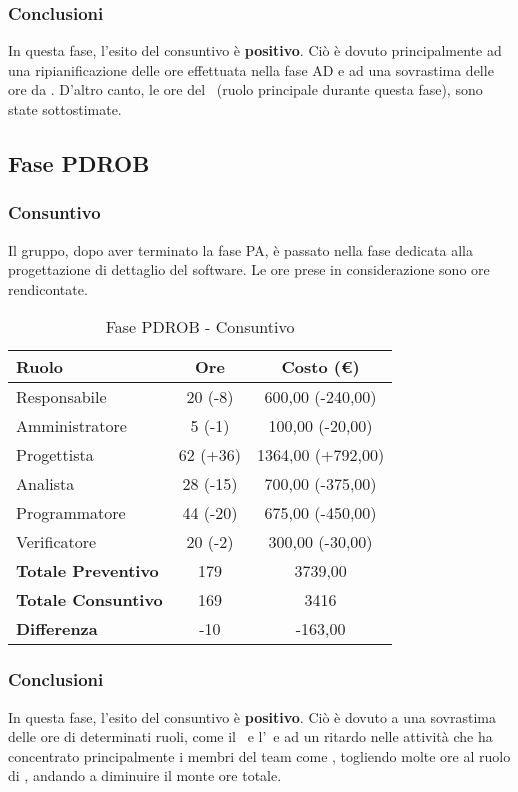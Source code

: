 \documentclass[../PianoProgetto.tex]{subfiles}
\begin{document}
	\subsubsection{Conclusioni}	
     In questa fase, l'esito del consuntivo è \textbf{positivo}. 
     Ciò è dovuto principalmente ad una ripianificazione delle ore effettuata nella fase AD e ad una sovrastima delle ore da \analista. D'altro canto, le ore del \progettista\ (ruolo principale durante questa fase), sono state sottostimate.
     
	\subsection{Fase PDROB}
	\subsubsection{Consuntivo}
	Il gruppo, dopo aver terminato la fase PA, è passato nella fase dedicata alla progettazione di dettaglio del software\g. Le ore prese in considerazione sono ore rendicontate. 
	
	\begin{table}[h]
		\centering
		\begin{tabular}{l * {2}{c}}
			\toprule
			\textbf{Ruolo} & \textbf{Ore} & \textbf{Costo (\euro{})} \\
			\midrule
			Responsabile &		20 (-8) & 600,00  (-240,00) \\
			Amministratore &	5 (-1) & 100,00  (-20,00) \\
			Progettista & 		62 (+36) & 1364,00  (+792,00)\\
			Analista & 			28	(-15)	& 700,00   (-375,00)       \\
			Programmatore & 	44	(-20)	& 675,00 	(-450,00)			\\
			Verificatore & 		20 (-2) & 300,00 (-30,00)	\\
			\midrule
			\textbf{Totale Preventivo} & 179
			& 3739,00
			\\		
			\textbf{Totale Consuntivo} & 169 & 3416 
			\\
			\midrule
			\textbf{Differenza} & -10 & -163,00 \\
			\bottomrule
		\end{tabular}
		
		\caption{Fase PDROB - Consuntivo}
		\label{tab:consuntivoPDROB}
		
	\end{table}		
	
	\subsubsection{Conclusioni}	
     In questa fase, l'esito del consuntivo è \textbf{positivo}. 
     Ciò è dovuto a una sovrastima delle ore di determinati ruoli, come il \responsabilediprogetto\ e l'\analista\, e ad un ritardo nelle attività che ha concentrato principalmente i membri del team come \progettisti, togliendo molte ore al ruolo di \programmatore, andando a diminuire il monte ore totale.
     
\end{document}

